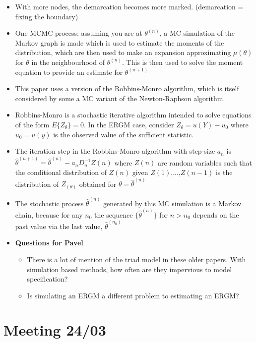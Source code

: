 \begin{itemize}
    \item With more nodes, the demarcation becomes more marked. (demarcation = fixing the boundary)
    \item One MCMC process: assuming you are at $\theta^(n)$, a MC simulation of the Markov graph is made which is used to estimate the moments of the distribution, which are then used to make an expansion approximating $\mu(\theta)$ for $\theta$ in the neighbourhood of $\theta^(n)$. This is then used to solve the moment equation to provide an estimate for $\theta^(n+1)$
    \item This paper uses a version of the Robbins-Monro algorithm, which is itself considered by some a MC variant of the Newton-Raphson algorithm.
    \item Robbins-Monro is a stochastic iterative algorithm intended to solve equations of the form $E\{Z_\theta\} = 0$. In the ERGM case, consider $Z_{\theta} = u(Y) - u_0$ where $u_0 = u(y)$ is the observed value of the sufficient statistic.
    \item The iteration step in the Robbins-Monro algorithm with step-size $a_n$ is $\hat{\theta}^{(n+1)} = \hat{\theta}^{(n)} - a_nD_n^{-1}Z(n)$ where $Z(n)$ are random variables such that the conditional distribution of $Z(n)$ given $Z(1)$,...,$Z(n-1)$ is the distribution of $Z_(\theta)$ obtained for $\theta = \hat{\theta}^(n)$
    \item The stochastic process $\hat{\theta}^(n)$ generated by this MC simulation is a Markov chain, because for any $n_0$ the sequence $\{\hat{\theta}^(n)\}$ for $n > n_0$ depends on the past value via the last value, $\hat{\theta}^(n_0)$
    \item \textbf{Questions for Pavel}
    \begin{itemize}
        \item There is a lot of mention of the triad model in these older papers. With simulation based methods, how often are they impervious to model specification?
        \item Is simulating an ERGM a different problem to estimating an ERGM?
    \end{itemize}
    
\end{itemize}

\section{Meeting 24/03}

